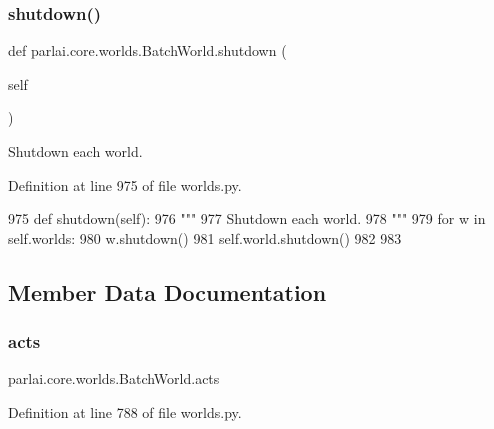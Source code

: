 \subsubsection{\texorpdfstring{shutdown()}{shutdown()}}
{\footnotesize\ttfamily def parlai.\+core.\+worlds.\+Batch\+World.\+shutdown (\begin{DoxyParamCaption}\item[{}]{self }\end{DoxyParamCaption})}

\begin{DoxyVerb}Shutdown each world.
\end{DoxyVerb}
 

Definition at line 975 of file worlds.\+py.


\begin{DoxyCode}
975     \textcolor{keyword}{def }shutdown(self):
976         \textcolor{stringliteral}{"""}
977 \textcolor{stringliteral}{        Shutdown each world.}
978 \textcolor{stringliteral}{        """}
979         \textcolor{keywordflow}{for} w \textcolor{keywordflow}{in} self.worlds:
980             w.shutdown()
981         self.world.shutdown()
982 
983 
\end{DoxyCode}


\subsection{Member Data Documentation}
\mbox{\label{classparlai_1_1core_1_1worlds_1_1BatchWorld_a89bd00f625520bf66dda7d113cf0b40e}} 
\subsubsection{\texorpdfstring{acts}{acts}}
{\footnotesize\ttfamily parlai.\+core.\+worlds.\+Batch\+World.\+acts}



Definition at line 788 of file worlds.\+py.

\mbox{\label{classparlai_1_1core_1_1worlds_1_1BatchWorld_a6f13286dedb14f257e043339b543cdeb}} 
